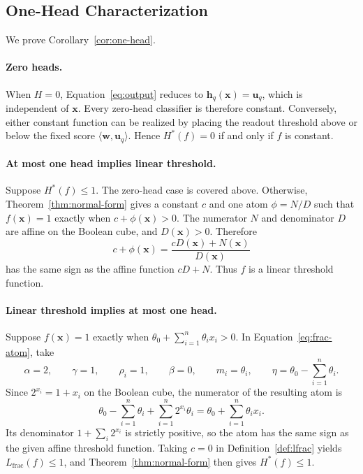 \documentclass{article}
\theoremstyle{definition}
\theoremstyle{plain}
\newcommand{\hstar}{H^{\ast}}
\begin{document}
\subsection{One-Head Characterization}
\label{app:proof-one-head}

We prove Corollary~\ref{cor:one-head}.

\paragraph{Zero heads.}
When $H=0$, Equation~\eqref{eq:output} reduces to $\mathbf{h}_q(\mathbf{x})=\mathbf{u}_q$, which is independent of $\mathbf{x}$. Every zero-head classifier is therefore constant. Conversely, either constant function can be realized by placing the readout threshold above or below the fixed score $\langle\mathbf{w},\mathbf{u}_q\rangle$. Hence $\hstar(f)=0$ if and only if $f$ is constant.

\paragraph{At most one head implies linear threshold.}
Suppose $\hstar(f)\leq1$. The zero-head case is covered above. Otherwise, Theorem~\ref{thm:normal-form} gives a constant $c$ and one atom $\phi=N/D$ such that $f(\mathbf{x})=1$ exactly when $c+\phi(\mathbf{x})>0$. The numerator $N$ and denominator $D$ are affine on the Boolean cube, and $D(\mathbf{x})>0$. Therefore
\begin{equation}
c+\phi(\mathbf{x})
=\frac{cD(\mathbf{x})+N(\mathbf{x})}{D(\mathbf{x})}
\end{equation}
has the same sign as the affine function $cD+N$. Thus $f$ is a linear threshold function.

\paragraph{Linear threshold implies at most one head.}
Suppose $f(\mathbf{x})=1$ exactly when $\theta_0+\sum_{i=1}^{n}\theta_ix_i>0$. In Equation~\eqref{eq:frac-atom}, take
\begin{equation}
\alpha=2,\qquad \gamma=1,\qquad \rho_i=1,\qquad \beta=0,\qquad m_i=\theta_i,\qquad
\eta=\theta_0-\sum_{i=1}^{n}\theta_i.
\end{equation}
Since $2^{x_i}=1+x_i$ on the Boolean cube, the numerator of the resulting atom is
\begin{equation}
\theta_0-\sum_{i=1}^{n}\theta_i
+\sum_{i=1}^{n}2^{x_i}\theta_i
=\theta_0+\sum_{i=1}^{n}\theta_ix_i.
\end{equation}
Its denominator $1+\sum_i2^{x_i}$ is strictly positive, so the atom has the same sign as the given affine threshold function. Taking $c=0$ in Definition~\ref{def:lfrac} yields $L_{\mathrm{frac}}(f)\leq1$, and Theorem~\ref{thm:normal-form} then gives $\hstar(f)\leq1$.
\end{document}
